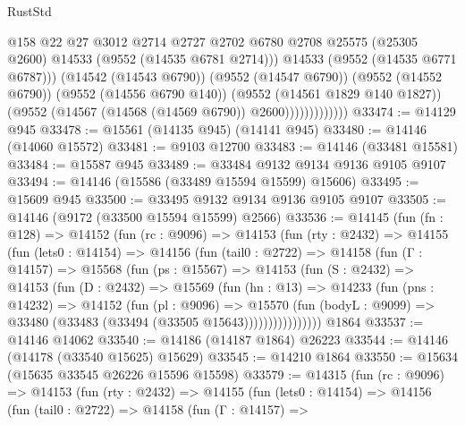 \begin{lexlean}{RustStd}
\begin{coremodule}
                              @158
                              @22
                              @27
                              @3012
                              @2714
                              @2727
                              @2702
                              @6780
                              @2708
                              @25575
                              (@25305 @2600)
                              @14533
                              (@9552 (@14535 @6781 @2714)))
                            @14533
                            (@9552 (@14535 @6771 @6787)))
                          (@14542 (@14543 @6790))
                          (@9552 (@14547 @6790))
                          (@9552 (@14552 @6790))
                          (@9552 (@14556 @6790 @140))
                          (@9552 (@14561 @1829 @140 @1827))
                          (@9552 (@14567 (@14568 (@14569 @6790)) @2600)))))))))))))
@33474 := @14129 @945
@33478 := @15561 (@14135 @945) (@14141 @945)
@33480 := @14146 (@14060 @15572)
@33481 := @9103 @12700
@33483 := @14146 (@33481 @15581)
@33484 := @15587 @945
@33489 := @33484 @9132 @9134 @9136 @9105 @9107
@33494 := @14146 (@15586 (@33489 @15594 @15599) @15606)
@33495 := @15609 @945
@33500 := @33495 @9132 @9134 @9136 @9105 @9107
@33505 := @14146 (@9172 (@33500 @15594 @15599) @2566)
@33536 := @14145
    (fun (fn : @128) =>
    @14152
      (fun (rc : @9096) =>
      @14153
        (fun (rty : @2432) =>
        @14155
          (fun (lets0 : @14154) =>
          @14156
            (fun (tail0 : @2722) =>
            @14158
              (fun (Γ : @14157) =>
              @15568
                (fun (ps : @15567) =>
                @14153
                  (fun (S : @2432) =>
                  @14153
                    (fun (D : @2432) =>
                    @15569
                      (fun (hn : @13) =>
                      @14233
                        (fun (pns : @14232) =>
                        @14152
                          (fun (pl : @9096) =>
                          @15570
                            (fun (bodyL : @9099) =>
                            @33480 (@33483 (@33494 (@33505 @15643))))))))))))))))
    @1864
@33537 := @14146 @14062
@33540 := @14186 (@14187 @1864) @26223
@33544 := @14146 (@14178 (@33540 @15625) @15629)
@33545 := @14210 @1864
@33550 := @15634 (@15635 @33545 @26226 @15596 @15598)
@33579 := @14315
    (fun (rc : @9096) =>
    @14153
      (fun (rty : @2432) =>
      @14155
        (fun (lets0 : @14154) =>
        @14156
          (fun (tail0 : @2722) =>
          @14158
            (fun (Γ : @14157) =>

\end{coremodule}
\end{lexlean}
